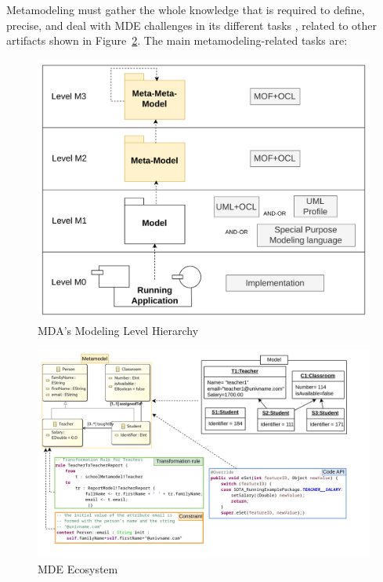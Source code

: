 Metamodeling must gather the whole  knowledge that is required to define, precise, and deal with MDE challenges in its different tasks \cite{wortmann2020modeling}, related to other artifacts shown in Figure~\ref{fig:mde_ecosystem}. The main metamodeling-related tasks are:

\begin{figure}[htbp]
	\begin{center}
		\includegraphics[width=0.6\linewidth]{./pics/soaPics/mofmodellevels2.png}
	\end{center}
	\caption{MDA’s Modeling Level Hierarchy}
	\label{fig:mofmodellevels}
\end{figure}
\begin{figure}[htbp]
	\begin{center}
		\includegraphics[width=\linewidth]{./pics/soaPics/notabstractecosystem2.png}
	\end{center}
	\caption{MDE Ecosystem}
	\label{fig:mde_ecosystem}
\end{figure}
